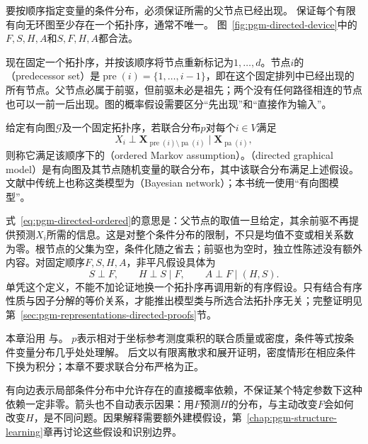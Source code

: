 要按顺序指定变量的条件分布，必须保证所需的父节点已经出现。
保证每个有限有向无环图至少存在一个拓扑序，通常不唯一。
图~\ref{fig:pgm-directed-device}中的$F,S,H,A$和$S,F,H,A$都合法。

现在固定一个拓扑序，并按该顺序将节点重新标记为$1,\ldots,d$。节点$i$的（predecessor set）是$\operatorname{pre}(i)=\{1,\ldots,i-1\}$，即在这个固定排列中已经出现的所有节点。父节点必属于前驱，但前驱未必是祖先；两个没有任何路径相连的节点也可以一前一后出现。图的概率假设需要区分“先出现”和“直接作为输入”。

\begin{definition}[有序Markov假设与有向图模型]
  \label{def:pgm-directed-ordered}
  给定有向图$\mathcal{G}$及一个固定拓扑序，若联合分布$p$对每个$i\in V$满足
  \begin{equation}
    X_i\perp
    \bm{X}_{\operatorname{pre}(i)\setminus\operatorname{pa}(i)}
    \mid\bm{X}_{\operatorname{pa}(i)},
    \label{eq:pgm-directed-ordered}
  \end{equation}
  则称它满足该顺序下的（ordered Markov assumption）。（directed graphical model）是有向图及其节点随机变量的联合分布，其中该联合分布满足上述假设。文献中传统上也称这类模型为（Bayesian network）；本书统一使用“有向图模型”。
\end{definition}

式~\eqref{eq:pgm-directed-ordered}的意思是：父节点的取值一旦给定，其余前驱不再提供预测$X_i$所需的信息。这是对整个条件分布的限制，不只是均值不变或相关系数为零。根节点的父集为空，条件化随之省去；前驱也为空时，独立性陈述没有额外内容。对固定顺序$F,S,H,A$，非平凡假设具体为
\[
  S\perp F,\qquad H\perp S\mid F,\qquad A\perp F\mid(H,S).
\]
单凭这个定义，不能不加论证地换一个拓扑序再调用新的有序假设。只有结合有序性质与因子分解的等价关系，才能推出模型类与所选合法拓扑序无关；完整证明见第~\ref{sec:pgm-representations-directed-proofs}节。

本章沿用
与。
$p$表示相对于坐标参考测度乘积的联合质量或密度，条件等式按条件变量分布几乎处处理解。
后文以有限离散求和展开证明，密度情形在相应条件下换为积分；本章不要求联合分布严格为正。

有向边表示局部条件分布中允许存在的直接概率依赖，不保证某个特定参数下这种依赖一定非零。箭头也不自动表示因果：用$F$预测$H$的分布，与主动改变$F$会如何改变$H$，是不同问题。因果解释需要额外建模假设，第~\ref{chap:pgm-structure-learning}章再讨论这些假设和识别边界。

